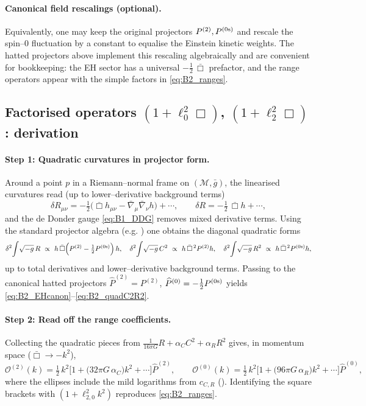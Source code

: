 \documentclass{iopjournal}
\begin{document}
\paragraph{Canonical field rescalings (optional).}
Equivalently, one may keep the original projectors $P^{(2)},P^{(0{\rm s})}$ and rescale the spin–0 fluctuation by a constant to equalise the Einstein kinetic weights. The hatted projectors above implement this rescaling algebraically and are convenient for bookkeeping: the EH sector has a universal $-\tfrac12\,\bar\Box$ prefactor, and the range operators appear with the simple factors in \eqref{eq:B2_ranges}.
\medskip

\subsection{\texorpdfstring
  {Factorised operators $(1+\ell_0^2\Box)$, $(1+\ell_2^2\Box)$: derivation}{Factorised operators (1+ell02 Box), (1+ell22 Box): derivation}}\label{app:B3}


\paragraph{Step 1: Quadratic curvatures in projector form.}
Around a point $p$ in a Riemann–normal frame on $(\mathcal M,\bar g)$, the linearised curvatures read (up to lower–derivative background terms)
\[
\delta R_{\mu\nu}=-\tfrac12\big(\bar\Box h_{\mu\nu}-\bar\nabla_\mu\bar\nabla_\nu h\big)+\cdots,
\qquad
\delta R=-\tfrac12\,\bar\Box h+\cdots,
\]
and the de Donder gauge \eqref{eq:B1_DDG} removes mixed derivative terms. Using the standard projector algebra (e.g. \cite{Stelle1977,ParkerToms}) one obtains the diagonal quadratic forms
\[
\delta^2\!\int\!\sqrt{-g}\,R
\ \propto\
h\,\bar\Box\!\left(P^{(2)}-\tfrac12 P^{(0{\rm s})}\right)h,
\quad
\delta^2\!\int\!\sqrt{-g}\,C^2
\ \propto\
h\,\bar\Box^{\,2}P^{(2)}h,
\quad
\delta^2\!\int\!\sqrt{-g}\,R^2
\ \propto\
h\,\bar\Box^{\,2}P^{(0{\rm s})}h,
\]
up to total derivatives and lower–derivative background terms. Passing to the canonical hatted projectors \(\widehat P^{(2)}=P^{(2)}\), \(\widehat P^{(0)}=-\tfrac12 P^{(0{\rm s})}\) yields \eqref{eq:B2_EHcanon}–\eqref{eq:B2_quadC2R2}.

\paragraph{Step 2: Read off the range coefficients.}
Collecting the quadratic pieces from
\(\tfrac{1}{16\pi G}R+\alpha_C C^2+\alpha_R R^2\)
gives, in momentum space ($\bar\Box\to-k^2$),
\[
\mathcal{O}^{(2)}(k)=\tfrac12\,k^2\Big[1+\big(32\pi G\,\alpha_C\big)k^2+\cdots\Big]\widehat P^{(2)},
\qquad
\mathcal{O}^{(0)}(k)=\tfrac12\,k^2\Big[1+\big(96\pi G\,\alpha_R\big)k^2+\cdots\Big]\widehat P^{(0)},
\]
where the ellipses include the mild logarithms from $c_{C,R}$ (). Identifying the square brackets with $(1+\ell_{2,0}^2 k^2)$ reproduces \eqref{eq:B2_ranges}.
\end{document}
